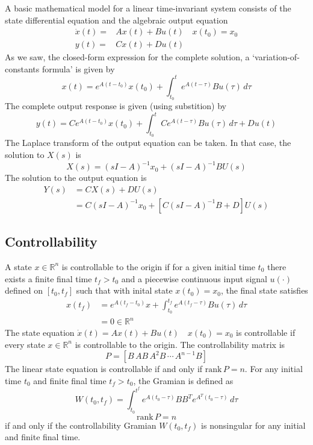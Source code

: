 \documentclass[11pt]{book}
\theoremstyle{example}
\begin{document}
A basic mathematical model for a linear time-invariant system consists of the state differential equation and the algebraic output equation
\begin{align}
	\dot{x}(t)=&Ax(t)+Bu(t)\quad{x(t_0)=x_0}\\
	y(t)=&Cx(t)+Du(t)
\end{align}
As we saw, the closed-form expression for the complete solution, a `variation-of-constants formula' is given by
\begin{equation}
	x(t)=e^{A(t-t_0)}x(t_0)+\int_{t_0}^t{e^{A(t-\tau)}Bu(\tau)\,d\tau}
\end{equation}
The complete output response is given (using substition) by
\begin{equation}
	y(t)=Ce^{A(t-t_0)}x(t_0)+\int_{t_0}^t{Ce^{A(t-\tau)}Bu(\tau)\,d\tau}+Du(t)
\end{equation}
The Laplace transform of the output equation can be taken. In that case, the solution to $X(s)$ is
\begin{equation}
	X(s)=(sI-A)^{-1}x_0+(sI-A)^{-1}BU(s)
\end{equation}
The solution to the output equation is
\begin{align}
	Y(s)&=CX(s)+DU(s)\\
	&=C(sI-A)^{-1}x_0+[C(sI-A)^{-1}B+D]U(s)
\end{align}

\subsection{Controllability}

A state $x\in\mathbb{R}^n$ is controllable to the origin if for a given initial time $t_0$ there exists a finite final time $t_f>t_0$ and a piecewise continuous input signal $u(\cdot)$ defined on $[t_0,t_f]$ such that with inital state $x(t_0)=x_0$, the final state satisfies
\begin{align}
	x(t_f)&=e^{A(t_f-t_0)}x+\int_{t_0}^{t_f}{e^{A(t_f-\tau)}Bu(\tau)\,d\tau}\\
	&=0\in\mathbb{R}^n
\end{align}
The state equation $\dot{x}(t)=Ax(t)+Bu(t)\quad{x}(t_0)=x_0$ is controllable if every state $x\in\mathbb{R}^n$ is controllable to the origin.
The controllability matrix is
\begin{equation}
	P=[B\,AB\,A^2B\,\cdots\,A^{n-1}B]
\end{equation}
The linear state equation is controllable if and only if $\mathrm{rank}\,P=n$. For any initial time $t_0$ and finite final time $t_f>t_0$, the Gramian is defined as
\begin{equation}
	W(t_0,t_f)=\int_{t_0}^{t^f}{e^{A(t_0-\tau)}BB^Te^{A^T(t_0-\tau)}\,d\tau}
\end{equation}
\begin{equation}
	\mathrm{rank}\,P=n
\end{equation}
if and only if the controllability Gramian $W(t_0,t_f)$ is nonsingular for any initial and finite final time.
\end{document}
